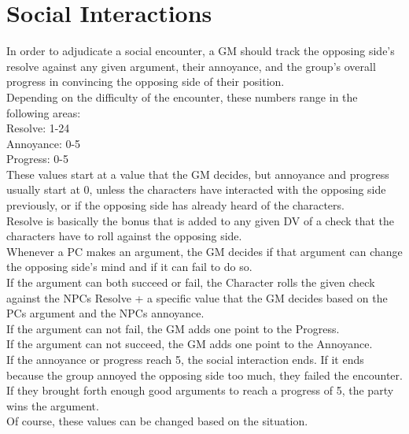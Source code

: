 \chapter{Social Interactions}
In order to adjudicate a social encounter, a GM should track the opposing side's resolve against any given argument, their annoyance, and the group's overall progress in convincing the opposing side of their position. \\
Depending on the difficulty of the encounter, these numbers range in the following areas:\\
Resolve: 1-24\\
Annoyance: 0-5\\
Progress: 0-5\\
These values start at a value that the GM decides, but annoyance and progress usually start at 0, unless the characters have interacted with the opposing side previously, or if the opposing side has already heard of the characters.\\
Resolve is basically the bonus that is added to any given DV of a check that the characters have to roll against the opposing side.\\
Whenever a PC makes an argument, the GM decides if that argument can change the opposing side's mind and if it can fail to do so.\\
If the argument can both succeed or fail, the Character rolls the given check against the NPCs Resolve + a specific value that the GM decides based on the PCs argument and the NPCs annoyance.\\
If the argument can not fail, the GM adds one point to the Progress.\\
If the argument can not succeed, the GM adds one point to the Annoyance.\\
If the annoyance or progress reach 5, the social interaction ends. If it ends because the group annoyed the opposing side too much, they failed the encounter. If they brought forth enough good arguments to reach a progress of 5, the party wins the argument.\\
Of course, these values can be changed based on the situation.